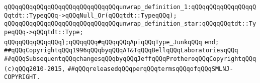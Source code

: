 \newline
\verb|qQQqqQQqqQQqqQQqqQQqqQQqqQQqqQQqunwrap_definition_1:qQQqqQQqqQQqqQQqqQQqtdt::TypeqQQq->qQQqNull_Or(qQQqtdt::TypeqQQq);|\newline
\verb|qQQqqQQqqQQqqQQqqQQqqQQqqQQqqQQqunwrap_definition_star:qQQqqQQqtdt::TypeqQQq->qQQqtdt::Type;|\newline
\newline
\verb|qQQqqQQqqQQqqQQq};qQQqqQQq#qQQqqQQqApiqQQqType_JunkqQQq|\newline
\verb|end;|\newline
\newline
\verb|##qQQqCopyrightqQQq1996qQQqbyqQQqAT&TqQQqBellqQQqLaboratoriesqQQq|\newline
\verb|##qQQqSubsequentqQQqchangesqQQqbyqQQqJeffqQQqProtheroqQQqCopyrightqQQq(c)qQQq2010-2015,|\newline
\verb|##qQQqreleasedqQQqperqQQqtermsqQQqofqQQqSMLNJ-COPYRIGHT.|\newline

